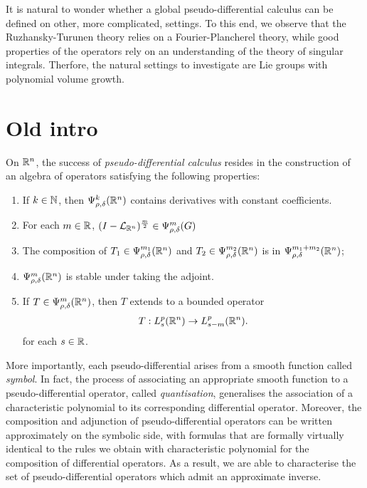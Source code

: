 It is natural to wonder whether a global pseudo-differential calculus can be defined on other,
more complicated, settings.
To this end,
we observe that the Ruzhansky-Turunen theory relies on a Fourier-Plancherel theory,
while good properties of the operators rely on an understanding of the theory of singular integrals.
Therfore,
the natural settings to investigate are Lie groups with polynomial volume growth.

\section{Old intro}

On $\R^n$,
the success of \emph{pseudo-differential calculus} resides in the construction of
an algebra of operators satisfying the following properties:
\begin{enumerate}
    \item If $k \in \N$, then $\OperatorClass [\R^n] k {\rho, \delta}$ contains derivatives with constant coefficients.
    \item For each $m \in \R$, $\BesselPotential [\R^n] m \in \OperatorClass m {\rho, \delta}$
    \item The composition of $T_1 \in \OperatorClass [\R^n] {m_1} {\rho, \delta}$ and $T_2 \in \OperatorClass [\R^n] {m_2} {\rho, \delta}$ is in $\OperatorClass [\R^n] {m_1 + m_2} {\rho, \delta}$;
    \item $\OperatorClass [\R^n] m {\rho, \delta}$ is stable under taking the adjoint.
    \item If $T \in \OperatorClass [\R^n] m {\rho, \delta}$,
        then $T$ extends to a bounded operator
        \begin{align*}
            T : \SobolevOrder [\R^n] p s \to \SobolevOrder [\R^n] p {s - m}.
        \end{align*}
        for each $s \in \R$.
\end{enumerate}

More importantly,
each pseudo-differential arises from a smooth function called \emph{symbol}.
In fact,
the process of associating an appropriate smooth function to a pseudo-differential operator,
called \emph{quantisation},
generalises the association of a characteristic polynomial to its corresponding differential operator.
Moreover,
the composition and adjunction of pseudo-differential operators can be written approximately on the symbolic side,
with formulas that are formally virtually identical to the rules we obtain with characteristic polynomial for the composition of differential operators.
As a result,
we are able to characterise the set of pseudo-differential operators which admit an approximate inverse.

